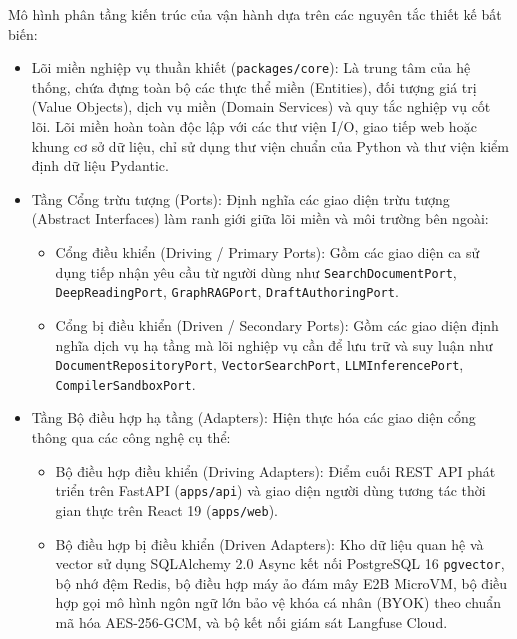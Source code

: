 Mô hình phân tầng kiến trúc của \VS vận hành dựa trên các nguyên tắc thiết kế bất biến:
\begin{itemize}
    \item Lõi miền nghiệp vụ thuần khiết (\texttt{packages/core}): Là trung tâm của hệ thống, chứa đựng toàn bộ các thực thể miền (Entities), đối tượng giá trị (Value Objects), dịch vụ miền (Domain Services) và quy tắc nghiệp vụ cốt lõi. Lõi miền hoàn toàn độc lập với các thư viện I/O, giao tiếp web hoặc khung cơ sở dữ liệu, chỉ sử dụng thư viện chuẩn của Python và thư viện kiểm định dữ liệu Pydantic.
    \item Tầng Cổng trừu tượng (Ports): Định nghĩa các giao diện trừu tượng (Abstract Interfaces) làm ranh giới giữa lõi miền và môi trường bên ngoài:
    \begin{itemize}[noitemsep, topsep=1pt]
        \item Cổng điều khiển (Driving / Primary Ports): Gồm các giao diện ca sử dụng tiếp nhận yêu cầu từ người dùng như \texttt{Search\allowbreak Document\allowbreak Port}, \texttt{Deep\allowbreak Reading\allowbreak Port}, \texttt{Graph\allowbreak RAG\allowbreak Port}, \texttt{Draft\allowbreak Authoring\allowbreak Port}.
        \item Cổng bị điều khiển (Driven / Secondary Ports): Gồm các giao diện định nghĩa dịch vụ hạ tầng mà lõi nghiệp vụ cần để lưu trữ và suy luận như \texttt{Document\allowbreak Repository\allowbreak Port}, \texttt{Vector\allowbreak Search\allowbreak Port}, \texttt{LLM\allowbreak Inference\allowbreak Port}, \texttt{Compiler\allowbreak Sandbox\allowbreak Port}.
    \end{itemize}
    \item Tầng Bộ điều hợp hạ tầng (Adapters): Hiện thực hóa các giao diện cổng thông qua các công nghệ cụ thể:
    \begin{itemize}[noitemsep, topsep=1pt]
        \item Bộ điều hợp điều khiển (Driving Adapters): Điểm cuối REST API phát triển trên FastAPI (\texttt{apps/api}) và giao diện người dùng tương tác thời gian thực trên React 19 (\texttt{apps/web}).
        \item Bộ điều hợp bị điều khiển (Driven Adapters): Kho dữ liệu quan hệ và vector sử dụng SQLAlchemy 2.0 Async kết nối PostgreSQL 16 \texttt{pgvector}, bộ nhớ đệm Redis, bộ điều hợp máy ảo đám mây E2B MicroVM, bộ điều hợp gọi mô hình ngôn ngữ lớn bảo vệ khóa cá nhân (BYOK) theo chuẩn mã hóa AES-256-GCM, và bộ kết nối giám sát Langfuse Cloud.
    \end{itemize}
\end{itemize}

